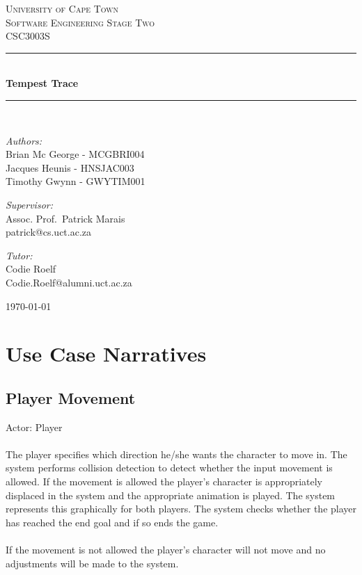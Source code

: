 \documentclass[a4paper,10pt]{article}
\begin{document}
\begin{titlepage} \begin{center} 
		\textsc{\LARGE University of Cape Town}
		\\[1.5cm] \textsc{\Large Software Engineering Stage Two\\CSC3003S}
		\\[0.5cm]
		\noindent\rule[0.4mm]{\textwidth}{0.1mm}
		\\[0.4cm] { \huge \bfseries Tempest Trace \\[0.4cm] }
		\noindent\rule[0.4mm]{\textwidth}{0.1mm}
		\\[1cm]
		\begin{minipage}[t]{0.4\textwidth}
		\begin{flushleft}\large \emph{Authors:}\\ Brian Mc George - MCGBRI004 \\ Jacques Heunis - HNSJAC003 \\ Timothy Gwynn - GWYTIM001\end{flushleft}
		 \end{minipage} \begin{minipage}[t]{0.4\textwidth} 
		\begin{flushright} \large \emph{Supervisor:} \\ Assoc. Prof.~Patrick Marais\\patrick@cs.uct.ac.za\end{flushright}
		\begin{flushright} \large \emph{Tutor:} \\ Codie Roelf\\Codie.Roelf@alumni.uct.ac.za\end{flushright}
		 \end{minipage} \vfill {\large \today}
		\end{center}
		\end{titlepage}
\newpage
\tableofcontents
\newpage

\section{Use Case Narratives}
\subsection{Player Movement}
Actor: Player\\\\
The player specifies which direction he/she wants the character to move in. The system performs collision detection to detect whether the input movement is allowed. If the movement is allowed the player's character is appropriately displaced in the system and the appropriate animation is played. The system represents this graphically for both players. The system checks whether the player has reached the end goal and if so ends the game.\\\\
If the movement is not allowed the player's character will not move and no adjustments will be made to the system.
\end{document}
